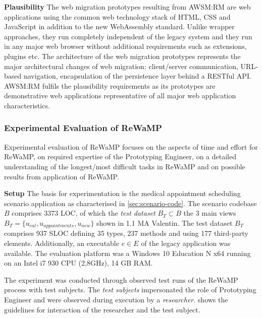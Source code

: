 \textbf{Plausibility} The web migration prototypes resulting from AWSM:RM are web applications using the common web technology stack of HTML, CSS and JavaScript in addition to the new WebAssembly standard.
Unlike wrapper approaches, they run completely independent of the legacy system and they run in any major web browser without additional requirements such as extensions, plugins etc.
The architecture of the web migration prototypes represents the major architectural changes of web migration: client/server communication, URL-based navigation, encapsulation of the persistence layer behind a RESTful API.
AWSM:RM fulfils the plausibility requirements as its prototypes are demonstrative web applications representative of all major web application characteristics.

\hypertarget{sec:rewamp.experiment}{%
\subsubsection{Experimental Evaluation of ReWaMP}\label{sec:rewamp.experiment}}

Experimental evaluation of ReWaMP focuses on the aspects of time and effort for ReWaMP, on required expertise of the Prototyping Engineer, on a detailed understanding of the longest/most difficult tasks in ReWaMP and on possible results from application of ReWaMP.

\textbf{Setup} The basis for experimentation is the medical appointment scheduling scenario application as characterised in \cref{sec:scenario-code}.
The scenario codebase \(B\) comprises 3373 LOC, of which the \emph{test dataset} \(B_T \subset B\) the 3 main views \(B_T = \{u_{cal}, u_{appointments}, u_{new}\}\) shown in 1.1 MA Valentin.
The test dataset \(B_T\) comprises 937 SLOC defining 35 types, 237 methods and using 177 third-party elements.
Additionally, an executable \(e \in E\) of the legacy application was available.
The evaluation platform was a Windows 10 Education N x64 running on an Intel i7 930 CPU (2,8GHz), 14 GB RAM.

The experiment was conducted through observed test runs of the ReWaMP process with test subjects.
The \emph{test subjects} impersonated the role of Prototyping Engineer and were observed during execution by a \emph{researcher}.
 shows the guidelines for interaction of the researcher and the test subject.

